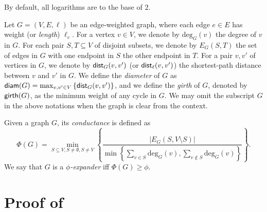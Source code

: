 \documentclass[11pt]{article}
\newtheorem{lemma}[theorem]{Lemma}
\theoremstyle{definition}
\newcommand{\set}[1]{\left\{ #1 \right\}}
\newcommand{\diam}{\textnormal{\textsf{diam}}}
\newcommand{\dist}{\textnormal{\textsf{dist}}}
\newcommand{\gir}{\textnormal{\textsf{girth}}}
\newcommand\vol{\mathsf{cost}}
\def\deg{\textrm{deg}}
\def\pr#1{\mathrm{Pr}\left[ #1 \right]}
\def\ex#1{{\mathbb{E}}\left[ #1 \right]}
\newcounter{note}
\begin{document}
By default, all logarithms are to the base of $2$. 

Let $G=(V,E,\ell)$ be an edge-weighted graph, where each edge $e\in E$ has weight (or \emph{length}) $\ell_e$. 
For a vertex $v\in V$, we denote by $\deg_G(v)$ the degree of $v$ in $G$.
For each pair $S,T\subseteq V$ of disjoint subsets, we denote by $E_{G}(S,T)$ the set of edges in $G$ with one endpoint in $S$ the other endpoint in $T$.
For a pair $v,v'$ of vertices in $G$, we denote by $\dist_{G}(v,v')$ (or $\dist_{\ell}(v,v')$) the shortest-path distance between $v$ and $v'$ in $G$.
We define the \emph{diameter} of $G$ as $\diam(G)=\max_{v,v'\in V}\set{\dist_G(v,v')}$, and we define the \emph{girth} of $G$, denoted by $\gir(G)$, as the minimum weight of any cycle in $G$.
We may omit the subscript $G$ in the above notations when the graph is clear from the context.


Given a graph $G$, its \emph{conductance} 
is defined as 
\[\Phi(G)=\min_{S\subseteq V, S \ne\emptyset, S\ne V}
\set{
\frac{|E_{G}(S,V\setminus S)|}
{\min\set{\sum_{v\in S}\deg_G(v),\sum_{v\notin S}\deg_G(v)}}
	}.\]
We say that $G$ is a \emph{$\phi$-expander} iff $\Phi(G)\ge\phi$. 

\section{Proof of }
\end{document}
